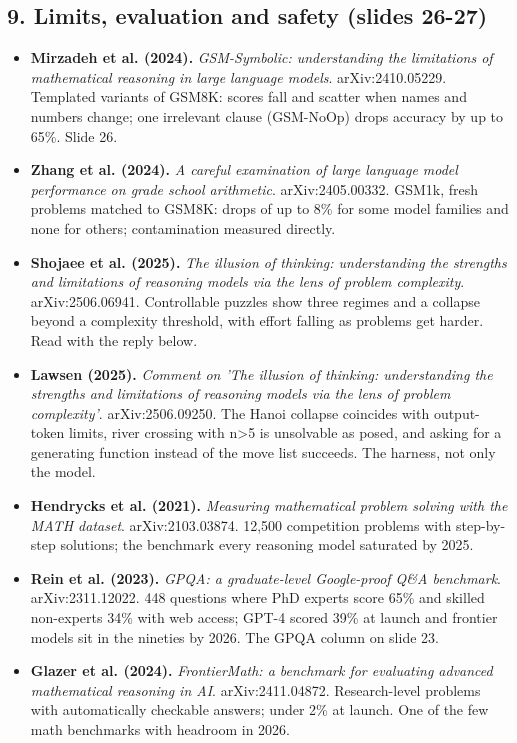 \subsection*{9. Limits, evaluation and safety (slides 26-27)}
\begin{itemize}[leftmargin=1.2em,itemsep=3pt]\sloppy
\item \textbf{Mirzadeh et al. (2024).} \textit{GSM-Symbolic: understanding the limitations of mathematical reasoning in large language models}. arXiv:2410.05229. Templated variants of GSM8K: scores fall and scatter when names and numbers change; one irrelevant clause (GSM-NoOp) drops accuracy by up to 65\%. Slide 26.
\item \textbf{Zhang et al. (2024).} \textit{A careful examination of large language model performance on grade school arithmetic}. arXiv:2405.00332. GSM1k, fresh problems matched to GSM8K: drops of up to 8\% for some model families and none for others; contamination measured directly.
\item \textbf{Shojaee et al. (2025).} \textit{The illusion of thinking: understanding the strengths and limitations of reasoning models via the lens of problem complexity}. arXiv:2506.06941. Controllable puzzles show three regimes and a collapse beyond a complexity threshold, with effort falling as problems get harder. Read with the reply below.
\item \textbf{Lawsen (2025).} \textit{Comment on 'The illusion of thinking: understanding the strengths and limitations of reasoning models via the lens of problem complexity'}. arXiv:2506.09250. The Hanoi collapse coincides with output-token limits, river crossing with n>5 is unsolvable as posed, and asking for a generating function instead of the move list succeeds. The harness, not only the model.
\item \textbf{Hendrycks et al. (2021).} \textit{Measuring mathematical problem solving with the MATH dataset}. arXiv:2103.03874. 12,500 competition problems with step-by-step solutions; the benchmark every reasoning model saturated by 2025.
\item \textbf{Rein et al. (2023).} \textit{GPQA: a graduate-level Google-proof Q\&A benchmark}. arXiv:2311.12022. 448 questions where PhD experts score 65\% and skilled non-experts 34\% with web access; GPT-4 scored 39\% at launch and frontier models sit in the nineties by 2026. The GPQA column on slide 23.
\item \textbf{Glazer et al. (2024).} \textit{FrontierMath: a benchmark for evaluating advanced mathematical reasoning in AI}. arXiv:2411.04872. Research-level problems with automatically checkable answers; under 2\% at launch. One of the few math benchmarks with headroom in 2026.

\end{itemize}
